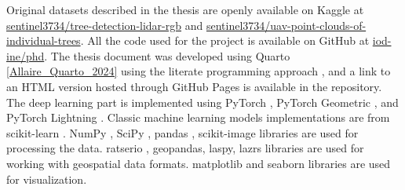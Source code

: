 Original datasets described in the thesis are openly available on Kaggle at \href{https://www.kaggle.com/datasets/sentinel3734/tree-detection-lidar-rgb}{sentinel3734/tree-detection-lidar-rgb} and \href{https://www.kaggle.com/datasets/sentinel3734/uav-point-clouds-of-individual-trees}{sentinel3734/uav-point-clouds-of-individual-trees}.
All the code used for the project is available on GitHub at \href{https://github.com/iod-ine/phd}{iod-ine/phd}.
The thesis document was developed using Quarto \ref{Allaire_Quarto_2024} using the literate programming approach \cite{knuth84}, and a link to an HTML version hosted through GitHub Pages is available in the repository.
The deep learning part is implemented using PyTorch \cite{Ansel_PyTorch_2_Faster_2024}, PyTorch Geometric \cite{Fey_Fast_Graph_Representation_2019}, and PyTorch Lightning \cite{Falcon_PyTorch_Lightning_2019}.
Classic machine learning models implementations are from scikit-learn \cite{scikit-learn}.
NumPy \cite{2020NumPy-Array}, SciPy \cite{2020SciPy-NMeth}, pandas \cite{The_pandas_development_team_pandas-dev_pandas_Pandas}, scikit-image \cite{van_der_Walt_scikit-image_image_processing_2014} libraries are used for processing the data.
ratserio \cite{gillies_2019}, geopandas, laspy, lazrs libraries are used for working with geospatial data formats.
matplotlib \cite{Hunter_Matplotlib_A_2D_2007} and seaborn \cite{waskomSeabornStatisticalData2021} libraries are used for visualization.
